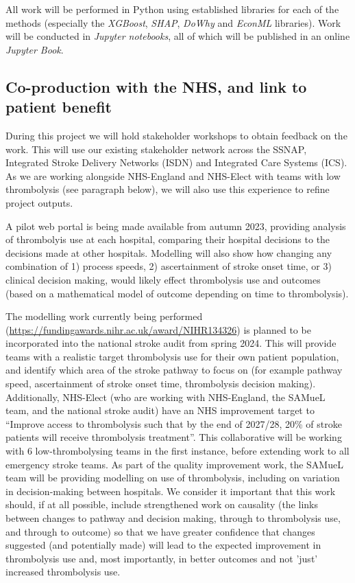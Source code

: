 All work will be performed in Python using established libraries for each of the methods (especially the \textit{XGBoost}, \textit{SHAP}, \textit{DoWhy} and \textit{EconML} libraries). Work will be conducted in \textit{Jupyter notebooks}, all of which will be published in an online \textit{Jupyter Book}.

\subsection{Co-production with the NHS, and link to patient benefit}

During this project we will hold stakeholder workshops to obtain feedback on the work. This will use our existing stakeholder network across the SSNAP, Integrated Stroke Delivery Networks (ISDN) and Integrated Care Systems (ICS). As we are working alongside NHS-England and NHS-Elect with teams with low thrombolysis (see paragraph below), we will also use this experience to refine project outputs.

A pilot web portal is being made available from autumn 2023, providing analysis of thrombolyis use at each hospital, comparing their hospital decisions to the decisions made at other hospitals. Modelling will also show how changing any combination of 1) process speeds, 2) ascertainment of stroke onset time, or 3) clinical decision making, would likely effect thrombolysis use and outcomes (based on a mathematical model of outcome depending on time to thrombolysis).

The modelling work currently being performed (\url{https://fundingawards.nihr.ac.uk/award/NIHR134326}) is planned to be incorporated into the national stroke audit from spring 2024. This will provide teams with a 
 realistic target thrombolysis use for their own patient population, and identify which area of the stroke pathway to focus on (for example pathway speed, ascertainment of stroke onset time, thrombolysis decision making). Additionally, NHS-Elect (who are working with NHS-England, the SAMueL team, and the national stroke audit) have an NHS improvement target to “Improve access to thrombolysis such that by the end of 2027/28, 20\% of stroke patients will receive thrombolysis treatment”. This collaborative will be working with 6 low-thrombolysing teams in the first instance, before extending work to all emergency stroke teams. As part of the quality improvement work, the SAMueL team will be providing modelling on use of thrombolysis, including on variation in decision-making between hospitals. We consider it important that this work should, if at all possible, include strengthened work on causality (the links between changes to pathway and decision making, through to thrombolysis use, and through to outcome) so that we have greater confidence that changes suggested (and potentially made) will lead to the expected improvement in thrombolysis use and, most importantly, in better outcomes and not 'just' increased thrombolysis use.

